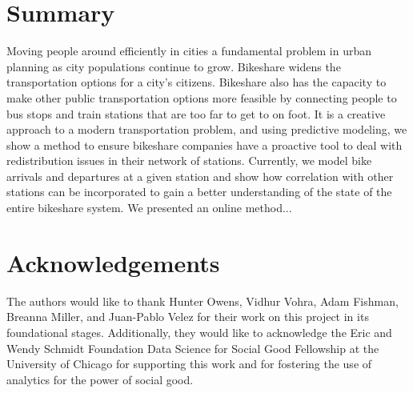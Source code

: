\documentclass{acm_proc_article-sp}
\begin{document}
\section{Summary}
Moving people around efficiently in cities a fundamental problem in urban planning as city populations continue to grow. Bikeshare widens the transportation options for a city's citizens. Bikeshare also has the capacity to make other public transportation options more feasible by connecting people to bus stops and train stations that are too far to get to on foot. It is a creative approach to a modern transportation problem, and using predictive modeling, we show a method to ensure bikeshare companies have a proactive tool to deal with redistribution issues in their network of stations. Currently, we model bike arrivals and departures at a given station and show how correlation with other stations can be incorporated to gain a better understanding of the state of the entire bikeshare system. We presented an online method...

\section{Acknowledgements}
The authors would like to thank Hunter Owens, Vidhur Vohra, Adam Fishman, Breanna Miller, and Juan-Pablo Velez for their work on this project in its foundational stages. Additionally, they would like to acknowledge the Eric and Wendy Schmidt Foundation Data Science for Social Good Fellowship at the University of Chicago for supporting this work and for fostering the use of analytics for the power of social good.



\end{document}

